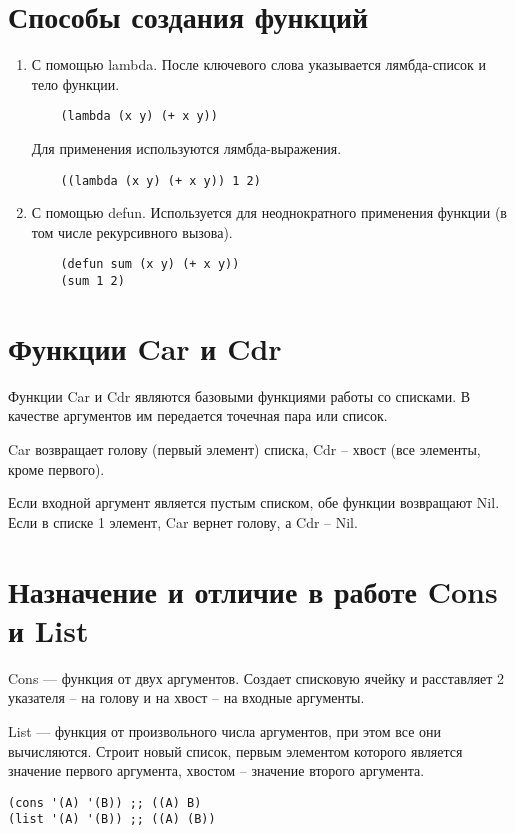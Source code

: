 \documentclass[14pt,a4paper]{scrreprt}
\begin{document}
\section{Способы создания функций}

\begin{enumerate}
	\item С помощью lambda. После ключевого слова указывается лямбда-список и тело функции. 
	\begin{lstlisting}
	(lambda (x y) (+ x y))
	\end{lstlisting}
	Для применения используются лямбда-выражения.
	\begin{lstlisting}
	((lambda (x y) (+ x y)) 1 2)
	\end{lstlisting}
	\item С помощью defun. Используется для неоднократного применения функции (в том числе рекурсивного вызова).
	\begin{lstlisting}
	(defun sum (x y) (+ x y))
	(sum 1 2)
	\end{lstlisting}
\end{enumerate}

\section{Функции Car и Cdr}

Функции Car и Cdr являются базовыми функциями работы со списками.
В качестве аргументов им передается точечная пара или список.

Car возвращает голову (первый элемент) списка, Cdr -- хвост (все элементы, кроме первого).

Если входной аргумент является пустым списком, обе функции возвращают Nil. Если в списке 1 элемент, Car вернет голову, а Cdr -- Nil.

\section{Назначение и отличие в работе Cons и List}

Cons --- функция от двух аргументов. Создает списковую ячейку и расставляет 2 указателя -- на голову и на хвост -- на входные аргументы.

List --- функция от произвольного числа аргументов, при этом все они вычисляются. Строит новый список, первым элементом которого является значение первого аргумента, хвостом -- значение второго аргумента.

\begin{lstlisting}
(cons '(A) '(B)) ;; ((A) B)
(list '(A) '(B)) ;; ((A) (B))
\end{lstlisting}
\end{document}
